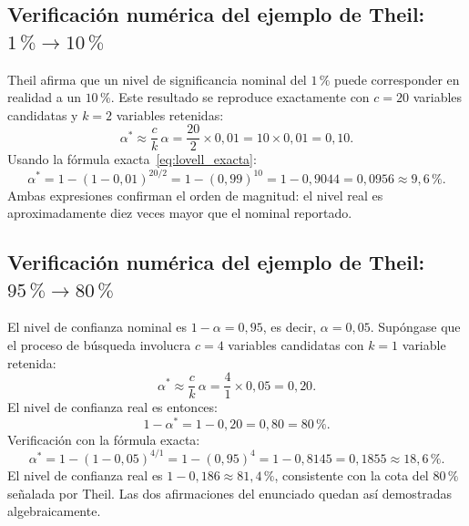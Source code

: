 \documentclass[12pt, letterpaper]{article}
\begin{document}
\subsection{Verificación numérica del ejemplo de Theil: $1\,\% \to 10\,\%$}

Theil afirma que un nivel de significancia nominal del $1\,\%$ puede
corresponder en realidad a un $10\,\%$. Este resultado se reproduce
exactamente con $c = 20$ variables candidatas y $k = 2$ variables
retenidas:
\begin{equation}
  \alpha^*
  \approx \frac{c}{k}\,\alpha
  = \frac{20}{2} \times 0{,}01
  = 10 \times 0{,}01
  = 0{,}10.
  \label{eq:ejemplo_1pct}
\end{equation}
Usando la fórmula exacta~\eqref{eq:lovell_exacta}:
\begin{equation}
  \alpha^* = 1 - (1 - 0{,}01)^{20/2}
           = 1 - (0{,}99)^{10}
           = 1 - 0{,}9044
           = 0{,}0956
           \approx 9{,}6\,\%.
  \label{eq:ejemplo_1pct_exacto}
\end{equation}
Ambas expresiones confirman el orden de magnitud: el nivel real es
aproximadamente diez veces mayor que el nominal reportado.

\subsection{Verificación numérica del ejemplo de Theil: $95\,\% \to 80\,\%$}

El nivel de confianza nominal es $1 - \alpha = 0{,}95$, es decir,
$\alpha = 0{,}05$. Supóngase que el proceso de búsqueda involucra
$c = 4$ variables candidatas con $k = 1$ variable retenida:
\begin{equation}
  \alpha^*
  \approx \frac{c}{k}\,\alpha
  = \frac{4}{1} \times 0{,}05
  = 0{,}20.
  \label{eq:ejemplo_5pct}
\end{equation}
El nivel de confianza real es entonces:
\begin{equation}
  1 - \alpha^* = 1 - 0{,}20 = 0{,}80 = 80\,\%.
  \label{eq:confianza_real}
\end{equation}
Verificación con la fórmula exacta:
\begin{equation}
  \alpha^* = 1 - (1 - 0{,}05)^{4/1}
           = 1 - (0{,}95)^{4}
           = 1 - 0{,}8145
           = 0{,}1855
           \approx 18{,}6\,\%.
  \label{eq:ejemplo_5pct_exacto}
\end{equation}
El nivel de confianza real es $1 - 0{,}186 \approx 81{,}4\,\%$,
consistente con la cota del $80\,\%$ señalada por Theil. Las dos
afirmaciones del enunciado quedan así demostradas algebraicamente.
\end{document}
